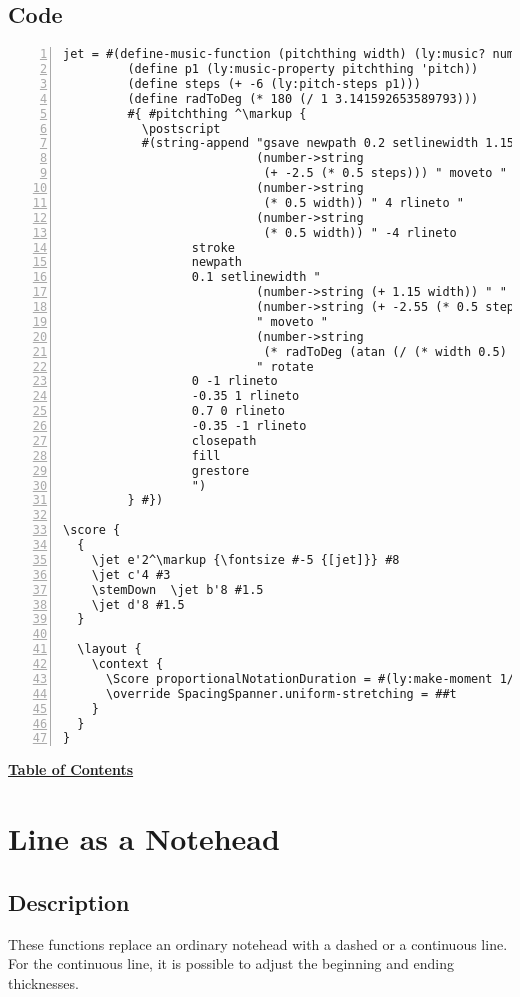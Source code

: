 \subsection{Code}
\begin{Verbatim}[numbers=left,xleftmargin=5mm]
jet = #(define-music-function (pitchthing width) (ly:music? number?)
         (define p1 (ly:music-property pitchthing 'pitch))
         (define steps (+ -6 (ly:pitch-steps p1)))
         (define radToDeg (* 180 (/ 1 3.141592653589793)))
         #{ #pitchthing ^\markup {
           \postscript
           #(string-append "gsave newpath 0.2 setlinewidth 1.15 "
                           (number->string 
                           	(+ -2.5 (* 0.5 steps))) " moveto "
                           (number->string 
                           	(* 0.5 width)) " 4 rlineto "
                           (number->string 
                           	(* 0.5 width)) " -4 rlineto
                  stroke
                  newpath
                  0.1 setlinewidth "
                           (number->string (+ 1.15 width)) " "
                           (number->string (+ -2.55 (* 0.5 steps)))
                           " moveto "
                           (number->string   
                            (* radToDeg (atan (/ (* width 0.5) 4))))
                           " rotate
                  0 -1 rlineto
                  -0.35 1 rlineto
                  0.7 0 rlineto
                  -0.35 -1 rlineto
                  closepath
                  fill
                  grestore
                  ")
         } #})

\score {
  {
    \jet e'2^\markup {\fontsize #-5 {[jet]}} #8
    \jet c'4 #3
    \stemDown  \jet b'8 #1.5
    \jet d'8 #1.5
  }

  \layout {
    \context {
      \Score proportionalNotationDuration = #(ly:make-moment 1/10)
      \override SpacingSpanner.uniform-stretching = ##t
    }
  }
}
\end{Verbatim}
\break
\hyperref[sec:toc]{\textbf{Table of Contents}}

\vfill \break




\section {Line as a Notehead}
\label{sec:line_notehead}
\hfill

\subsection{Description}
These functions replace an ordinary notehead with a dashed or a continuous line. For the continuous line, it is possible to adjust the beginning and ending thicknesses.
